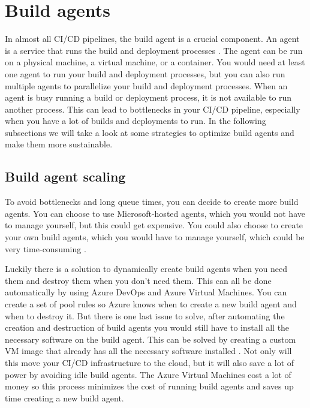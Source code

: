 \section{Build agents}
In almost all CI/CD pipelines, the build agent is a crucial component. An agent is a service that runs the build and deployment processes \autocite{packtpub}.
The agent can be run on a physical machine, a virtual machine, or a container. 
You would need at least one agent to run your build and deployment processes, but you can also run multiple agents to parallelize your build and deployment processes.
When an agent is busy running a build or deployment process, it is not available to run another process.
This can lead to bottlenecks in your CI/CD pipeline, especially when you have a lot of builds and deployments to run.
In the following subsections we will take a look at some strategies to optimize build agents and make them more sustainable.

\subsection{Build agent scaling}
To avoid bottlenecks and long queue times, you can decide to create more build agents.
You can choose to use Microsoft-hosted agents, which you would not have to manage yourself, but this could get expensive.
You could also choose to create your own build agents, which you would have to manage yourself, which could be very time-consuming \autocite{hexmaster}.

Luckily there is a solution to dynamically create build agents when you need them and destroy them when you don't need them.
This can all be done automatically by using Azure DevOps and Azure Virtual Machines. You can create a set of pool rules so Azure knows when to create a new build agent and when to destroy it.
But there is one last issue to solve, after automating the creation and destruction of build agents you would still have to install all the necessary software on the build agent.
This can be solved by creating a custom VM image that already has all the necessary software installed \autocite{hexmaster}.
Not only will this move your CI/CD infrastructure to the cloud, but it will also save a lot of power by avoiding idle build agents.
The Azure Virtual Machines cost a lot of money so this process minimizes the cost of running build agents and saves up time creating a new build agent.
